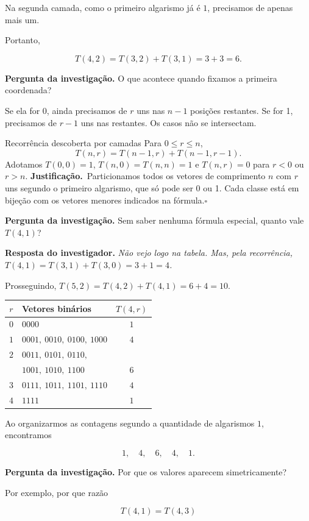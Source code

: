 \documentclass[11pt,a4paper,oneside]{book}
\newcommand{\Pergunta}[1]{\begin{perguntabox}\textbf{Pergunta da investigação.} #1\end{perguntabox}}
\newcommand{\Resposta}[1]{\textcolor{verdeescuro}{\textbf{Resposta do investigador.}} \emph{#1}\par}
\newcommand{\prova}{\textbf{Justificação.}\ }
\newcommand{\fimprova}{\hfill$\square$}
\renewcommand\arraystretch{1.18}
\begin{document}
Na segunda camada, como o primeiro algarismo
já é $1$, precisamos de apenas mais um.

Portanto,

\[
T(4,2)=T(3,2)+T(3,1)=3+3=6.
\]

\Pergunta{O que acontece quando fixamos a primeira coordenada?}
Se ela for 0, ainda precisamos de $r$ uns nas $n-1$ posições restantes. Se for 1, precisamos de $r-1$ uns nas restantes. Os casos não se intersectam.
\begin{teoremabox}{Recorrência descoberta por camadas}
Para $0\le r\le n$,
\[\boxed{T(n,r)=T(n-1,r)+T(n-1,r-1)}.\]
Adotamos $T(0,0)=1$, $T(n,0)=T(n,n)=1$ e $T(n,r)=0$ para $r<0$ ou $r>n$.
\prova Particionamos todos os vetores de comprimento $n$ com $r$ uns segundo o primeiro algarismo, que só pode ser 0 ou 1. Cada classe está em bijeção com os vetores menores indicados na fórmula.\fimprova
\end{teoremabox}
\Pergunta{Sem saber nenhuma fórmula especial, quanto vale $T(4,1)$?}
\Resposta{Não vejo logo na tabela. Mas, pela recorrência, $T(4,1)=T(3,1)+T(3,0)=3+1=4$.}
Prosseguindo, $T(5,2)=T(4,2)+T(4,1)=6+4=10$.


\begin{center}
\renewcommand{\arraystretch}{1.6}
\begin{tabular}{c|l|c}
\hline
$r$ & \textbf{Vetores binários} & $T(4,r)$ \\
\hline
$0$ & $0000$ & $1$ \\

$1$ & $0001,\ 0010,\ 0100,\ 1000$ & $4$ \\

$2$ & $0011,\ 0101,\ 0110,$ & \\
    & $1001,\ 1010,\ 1100$ & $6$ \\

$3$ & $0111,\ 1011,\ 1101,\ 1110$ & $4$ \\

$4$ & $1111$ & $1$ \\
\hline
\end{tabular}
\end{center}

Ao organizarmos as contagens segundo a quantidade
de algarismos $1$, encontramos

\[
\boxed{1,\quad4,\quad6,\quad4,\quad1}.
\]

\Pergunta{Por que os valores aparecem
simetricamente?}

Por exemplo, por que razão

\[
T(4,1)=T(4,3)
\]
\end{document}
